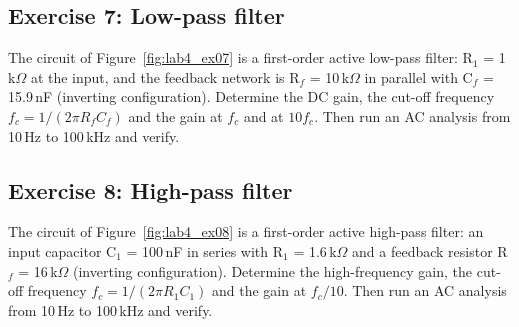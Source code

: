 

\subsection{Exercise 7: Low-pass filter}
The circuit of Figure~\ref{fig:lab4_ex07} is a first-order active low-pass filter: R$_1$ = 1\,k$\Omega$ at the input, and the feedback network is R$_f$ = 10\,k$\Omega$ in parallel with C$_f$ = 15.9\,nF (inverting configuration). Determine the DC gain, the cut-off frequency $f_c=1/(2\pi R_fC_f)$ and the gain at $f_c$ and at $10f_c$. Then run an AC analysis from 10\,Hz to 100\,kHz and verify.






\subsection{Exercise 8: High-pass filter}
The circuit of Figure~\ref{fig:lab4_ex08} is a first-order active high-pass filter: an input capacitor C$_1$ = 100\,nF in series with R$_1$ = 1.6\,k$\Omega$ and a feedback resistor R$_f$ = 16\,k$\Omega$ (inverting configuration). Determine the high-frequency gain, the cut-off frequency $f_c=1/(2\pi R_1C_1)$ and the gain at $f_c/10$. Then run an AC analysis from 10\,Hz to 100\,kHz and verify.

